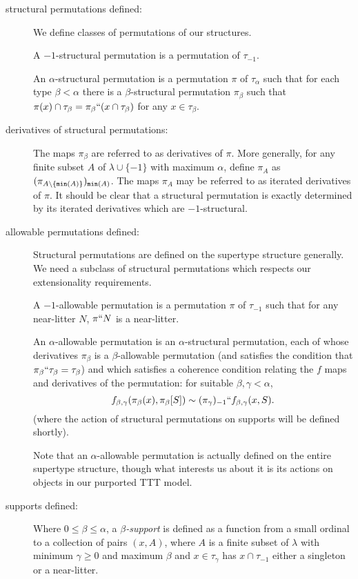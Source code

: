 \documentclass[112pt]{article}
\begin{document}
\begin{description}
\item[structural permutations defined:]  We define classes of permutations of our structures.

A $-1$-structural permutation is a permutation of $\tau_{-1}$.

An $\alpha$-structural permutation is a permutation $\pi$ of $\tau_\alpha$ such that for each type $\beta<\alpha$ there is a $\beta$-structural permutation
$\pi_\beta$ such that $\pi(x) \cap \tau_\beta = \pi_\beta``(x \cap \tau_\beta)$ for any $x \in \tau_\beta$.

\item[derivatives of structural permutations:]  The maps $\pi_\beta$ are referred to as derivatives of $\pi$.  More generally, for any finite subset $A$ of $\lambda \cup \{-1\}$ with maximum $\alpha$,
define $\pi_A$ as $(\pi_{A \setminus \{{\tt min}(A)\}})_{{\tt min}(A)}$.  The maps $\pi_A$ may be referred to as iterated derivatives of $\pi$.  It should be clear that a structural permutation is exactly determined by its iterated derivatives which are $-1$-structural.

\item[allowable permutations defined:]  Structural permutations are defined on the supertype structure generally.  We need a subclass of structural permutations which respects our extensionality requirements.

A $-1$-allowable permutation is a permutation $\pi$ of $\tau_{-1}$ such that for any near-litter $N$, $\pi``N$ is a near-litter.

An $\alpha$-allowable permutation is an $\alpha$-structural permutation, each of whose derivatives $\pi_\beta$ is a $\beta$-allowable permutation (and satisfies the condition that $\pi_\beta``\tau_\beta = \tau_\beta$) and which satisfies a coherence condition relating the $f$ maps and derivatives of the permutation:  for suitable $\beta,\gamma<\alpha$, $$f_{\beta,\gamma}(\pi_\beta(x),\pi_{\beta}[S]) \sim (\pi_\gamma)_{-1}``f_{\beta,\gamma}(x,S).$$  (where the action of structural permutations on supports will be defined shortly).

Note that an $\alpha$-allowable permutation is actually defined on the entire supertype structure, though what interests us about it is its actions on objects in our purported TTT model.

\item[supports defined:]  Where $0\leq\beta \leq \alpha$, a {\em $\beta$-support\/} is defined as a function from a small ordinal to a collection of pairs $(x,A)$, where $A$ is a finite subset of $\lambda$ with minimum $\gamma\geq 0$ and maximum $\beta$ and $x \in \tau_\gamma$ has $x \cap \tau_{-1}$ either a singleton or a near-litter.   


\end{description}
\end{document}
